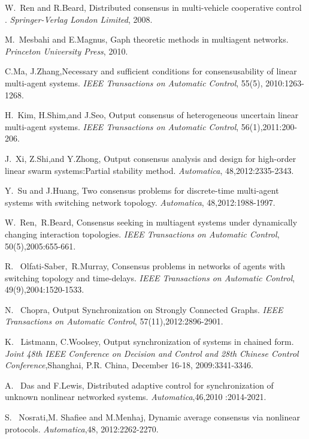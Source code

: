 \documentclass[english]{cccconf}
\begin{document}
{{\begin{thebibliography}{0}

W.~Ren and R.Beard, Distributed consensus in multi-vehicle cooperative control . \emph{Springer-Verlag London Limited}, 2008.

M.~Mesbahi and E.Magnus, Gaph theoretic methods in multiagent networks.
 \emph{Princeton University Press}, 2010.

C.Ma, J.Zhang,Necessary and sufficient conditions for consensusability of linear multi-agent systems.
\emph{IEEE Transactions on Automatic Control}, 55(5), 2010:1263-1268.

H.~Kim,  H.Shim,and J.Seo, Output consensus of heterogeneous uncertain linear multi-agent systems.
 \emph{IEEE Transactions on Automatic Control}, 56(1),2011:200-206.

J.~Xi,  Z.Shi,and Y.Zhong, Output consensus analysis and design for high-order linear swarm systems:Partial stability method.
 \emph{Automatica}, 48,2012:2335-2343.

Y.~Su and J.Huang, Two consensus problems for discrete-time multi-agent systems with switching network topology.
 \emph{Automatica}, 48,2012:1988-1997.

W.~Ren,~R.Beard, Consensus seeking in multiagent systems under dynamically changing interaction topologies.
 \emph{IEEE Transactions on Automatic Control}, 50(5),2005:655-661.

R.~ Olfati-Saber,~R.Murray, Consensus problems in networks of agents with switching topology and time-delays.
 \emph{IEEE Transactions on Automatic Control}, 49(9),2004:1520-1533.

N.~ Chopra, Output Synchronization on Strongly Connected Graphs.
 \emph{IEEE Transactions on Automatic Control}, 57(11),2012:2896-2901.


K.~ Listmann, C.Woolsey, Output synchronization of systems in chained form.
 \emph{Joint 48th IEEE Conference on Decision and Control and 28th Chinese Control Conference},Shanghai, P.R. China, December 16-18, 2009:3341-3346.

A.~ Das and F.Lewis, Distributed adaptive control for synchronization of unknown nonlinear networked systems.
\emph{Automatica},46,2010 :2014-2021.

S.~ Nosrati,M. Shafiee and M.Menhaj, Dynamic average consensus via nonlinear protocols.
 \emph{Automatica},48, 2012:2262-2270.



\end{thebibliography}}}
\end{document}

